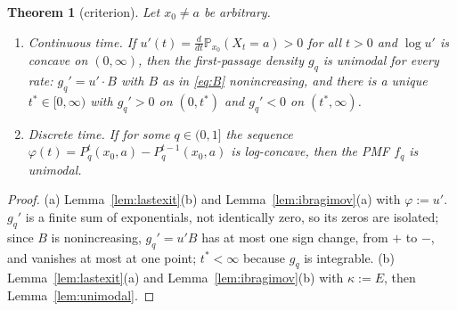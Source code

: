 \documentclass[11pt,a4paper]{article}
\newtheorem{theorem}{Theorem}[section]
\theoremstyle{definition}
\newcommand{\Prob}{\mathbb P}
\begin{document}
\begin{theorem}[criterion]\label{thm:criterion}
Let $x_0\ne a$ be arbitrary.
\begin{enumerate}
\item[(a)] \emph{Continuous time.} If $u'(t)=\frac{d}{dt}\Prob_{x_0}(X_t=a)>0$ for all $t>0$ and $\log u'$ is concave on $(0,\infty)$, then the first-passage density $g_q$ is unimodal for every rate: $g_q'=u'\cdot B$ with $B$ as in \eqref{eq:B} nonincreasing, and there is a unique $t^*\in[0,\infty)$ with $g_q'>0$ on $(0,t^*)$ and $g_q'<0$ on $(t^*,\infty)$.
\item[(b)] \emph{Discrete time.} If for some $q\in(0,1]$ the sequence $\varphi(t)=P_q^t(x_0,a)-P_q^{t-1}(x_0,a)$ is log-concave, then the PMF $f_q$ is unimodal.
\end{enumerate}
\end{theorem}
\begin{proof}
(a) Lemma~\ref{lem:lastexit}(b) and Lemma~\ref{lem:ibragimov}(a) with $\varphi:=u'$. $g_q'$ is a finite sum of exponentials, not identically zero, so its zeros are isolated; since $B$ is nonincreasing, $g_q'=u'B$ has at most one sign change, from $+$ to $-$, and vanishes at most at one point; $t^*<\infty$ because $g_q$ is integrable. (b) Lemma~\ref{lem:lastexit}(a) and Lemma~\ref{lem:ibragimov}(b) with $\kappa:=E$, then Lemma~\ref{lem:unimodal}.
\end{proof}
\end{document}

